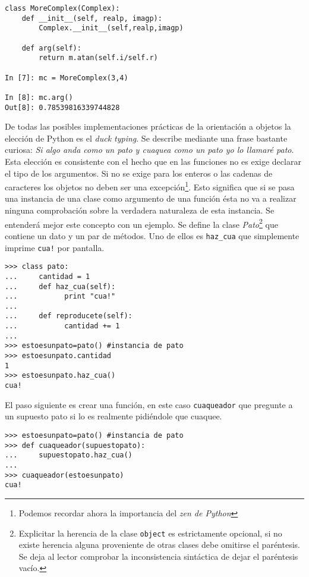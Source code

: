\documentclass[a4paper,10pt]{article}
\begin{document}
\begin{lstlisting}
class MoreComplex(Complex):
    def __init__(self, realp, imagp):
        Complex.__init__(self,realp,imagp)

    def arg(self):
        return m.atan(self.i/self.r)

In [7]: mc = MoreComplex(3,4)

In [8]: mc.arg()
Out[8]: 0.78539816339744828
\end{lstlisting} 

De todas las posibles implementaciones prácticas de la orientación a
objetos la elección de Python es el \emph{duck typing}.  Se describe
mediante una frase bastante curiosa: \emph{Si algo anda como un pato y
  cuaquea como un pato yo lo llamaré pato}.  Esta elección es
consistente con el hecho que en las funciones no es exige declarar el
tipo de los argumentos.  Si no se exige para los enteros o las cadenas
de caracteres los objetos no deben ser una excepción\footnote{Podemos
  recordar ahora la importancia del \emph{zen de Python}}.  Esto
significa que si se pasa una instancia de una clase como argumento de
una función ésta no va a realizar ninguna comprobación sobre la
verdadera naturaleza de esta instancia.  Se entenderá mejor este
concepto con un ejemplo.  Se define la clase
\emph{Pato}\footnote{Explicitar la herencia de la clase
  \texttt{object} es estrictamente opcional, si no existe herencia
  alguna proveniente de otras clases debe omitirse el paréntesis.  Se
  deja al lector comprobar la inconsistencia sintáctica de dejar el
  paréntesis vacío.} que contiene un dato y un par de métodos. Uno de
ellos es \texttt{haz\_cua} que simplemente imprime \texttt{cua!} por
pantalla.

\begin{lstlisting}
>>> class pato:
...     cantidad = 1
...     def haz_cua(self):
...           print "cua!"
...
...     def reproducete(self):
...           cantidad += 1
...
>>> estoesunpato=pato() #instancia de pato
>>> estoesunpato.cantidad
1
>>> estoesunpato.haz_cua()
cua!
\end{lstlisting} 

El paso siguiente es crear una función, en este caso
\texttt{cuaqueador} que pregunte a un supuesto pato si lo es realmente
pidiéndole que cuaquee.

\begin{lstlisting}
>>> estoesunpato=pato() #instancia de pato
>>> def cuaqueador(supuestopato):
...     supuestopato.haz_cua()
...
>>> cuaqueador(estoesunpato)
cua!
\end{lstlisting}
\end{document}
